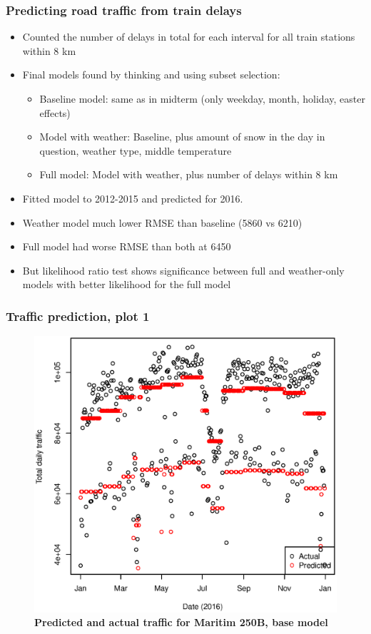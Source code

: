 \documentclass{beamer}
\begin{document}
\begin{frame}\frametitle{Predicting road traffic from train delays}
\begin{itemize}
\item Counted the number of delays in total for each interval for all train stations within 8 km
\item Final models found by thinking and using subset selection:
\begin{itemize}
\item Baseline model: same as in midterm (only weekday, month, holiday, easter effects)
\item Model with weather: Baseline, plus amount of snow in the day in question, weather type, middle temperature
\item Full model: Model with weather, plus number of delays within 8 km
\end{itemize}
\item Fitted model to 2012-2015 and predicted for 2016.
\item Weather model much lower RMSE than baseline (5860 vs 6210)
\item Full model had worse RMSE than both at 6450
\item But likelihood ratio test shows significance between full and weather-only models with better likelihood for the full model
\end{itemize}
\end{frame}

\begin{frame}\frametitle{Traffic prediction, plot 1}
\begin{figure}
  \centering
   \includegraphics[scale=0.35]{plots/predict_maritim_dateonly.eps}
    \caption{\textbf{Predicted and actual traffic for Maritim 250B, \hspace{\textwidth}base model}}
\end{figure}
\end{frame}
\end{document}
